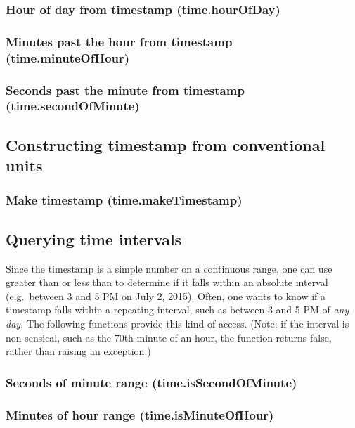\documentclass{article}
\theoremstyle{definition}
\begin{document}
\subsubsection{Hour of day from timestamp (time.hourOfDay)}

\subsubsection{Minutes past the hour from timestamp (time.minuteOfHour)}

\subsubsection{Seconds past the minute from timestamp (time.secondOfMinute)}

\subsection{Constructing timestamp from conventional units}

\subsubsection{Make timestamp (time.makeTimestamp)}

\subsection{Querying time intervals}

Since the timestamp is a simple number on a continuous range, one can use greater than or less than to determine if it falls within an absolute interval (e.g.\ between 3 and 5 PM on July 2, 2015).  Often, one wants to know if a timestamp falls within a repeating interval, such as between 3 and 5 PM of {\it any day.}  The following functions provide this kind of access.  (Note: if the interval is non-sensical, such as the 70th minute of an hour, the function returns false, rather than raising an exception.)

\subsubsection{Seconds of minute range (time.isSecondOfMinute)}

\subsubsection{Minutes of hour range (time.isMinuteOfHour)}
\end{document}
